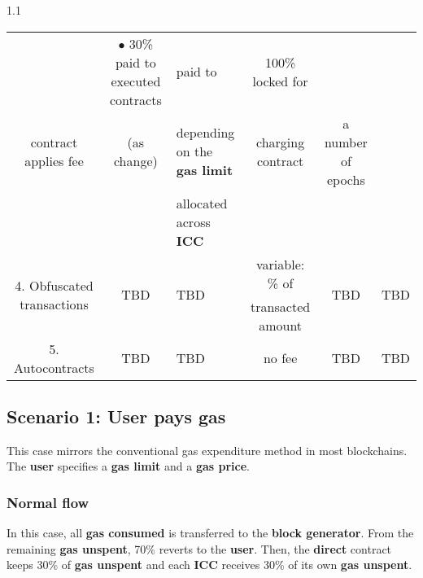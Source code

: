 \documentclass[twocolumn, nofootinbib]{revtex4-2} %
\newcommand{\emphasize}[1]{\textbf{#1}\xspace}
\newcommand{\blockgenerator}{\emphasize{block generator}}
\newcommand{\direct}{\emphasize{direct}}
\newcommand{\gasprice}{\emphasize{gas price}}
\newcommand{\gaslimit}{\emphasize{gas limit}}
\newcommand{\gasconsumed}{\emphasize{gas consumed}}
\newcommand{\gasunspent}{\emphasize{gas unspent}}
\newcommand{\icc}{\emphasize{ICC}}
\newcommand{\user}{\emphasize{user}}
\begin{document}
\begin{table*}[t]
\begin{spacing}{1.1}
{\begin{tabular}{| c | c | l | c | c | c |}
					& $\bullet$ 30\% paid to executed contracts
					& paid to
					& 100\% locked for
					&
					\\
					contract applies fee
					& (as change)
					& \hspace{0.2cm} depending on the \gaslimit
					& charging contract
					& a number of epochs
					&
					\\
					&
					& \hspace{0.2cm} allocated across \icc
					&
					&
					&
					\\ \hline
					\multirow{2}{*}{4. Obfuscated transactions}
					& \multirow{2}{*}{TBD}
					& \multirow{2}{*}{TBD}
					& variable: \% of
					& \multirow{2}{*}{TBD}
					& \multirow{2}{*}{TBD}
					\\

					&
					&
					& transacted amount
					&
					&
					\\
					\hline
					5. Autocontracts
					& TBD
					& TBD
					& no fee
					& TBD
					& TBD
					\\
					\hline
				\end{tabular}
			}
			\caption{Summary of how gas and fees are handled in each scenario.}
			\label{tab:gas}
		\end{spacing}
	\end{table*}

    \subsection{Scenario 1: User pays gas}\label{sec:specifications:scenario-1}
    This case mirrors the conventional gas expenditure method in most
    blockchains.
    The \user specifies a \gaslimit and a \gasprice.

    \subsubsection{Normal flow}\label{sec:specifications:scenario-1:normal-flow}

    In this case, all \gasconsumed is transferred to the \blockgenerator. From the remaining \gasunspent, 70\% reverts to the \user. Then, the \direct contract keeps 30\% of \gasunspent and each \icc receives 30\% of its own \gasunspent.
\end{document}
